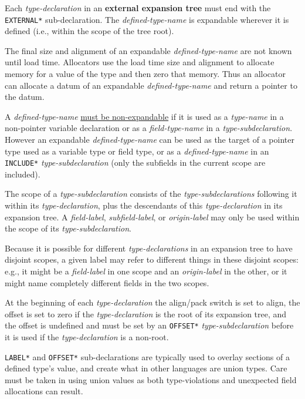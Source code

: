\documentclass[12pt]{article}
\newcommand{\key}[1]{{\rm \bfseries #1}}
\begin{document}
Each {\em type-declaration} in an \key{external expansion tree}
must end with the {\tt *EXTERNAL*}\label{*EXTERNAL*} sub-declaration.
The {\em defined-type-name} is expandable wherever it is defined
(i.e., within the scope of the tree root).

The final size and alignment of an expandable {\em defined-type-name}
are not known until load time.
Allocators use the load time
size and alignment to allocate memory for a value of
the type and then zero that memory.  Thus an allocator
can allocate a datum of an expandable {\em defined-type-name}
and return a pointer to the datum.

A {\em defined-type-name} \underline{must be non-expandable} if it is used as
a {\em type-name} in a non-pointer variable declaration
or as a {\em field-type-name}
in a {\em type-subdeclaration}.
However an expandable
{\em defined-type-name}
can be used as the target of a pointer type used as a variable type or
field type,
or as a {\em defined-type-name} in an
{\tt *INCLUDE*} {\em type-subdeclaration}
(only the subfields in the current scope are included).

The scope of a {\em type-subdeclaration} consists of
the {\em type-subdeclarations} following it within its
{\em type-declaration}, plus the descendants
of this {\em type-declaration} in its expansion tree.
A {\em field-label}, {\em subfield-label}, or {\em origin-label} may
only be used within the scope of its {\em type-subdeclaration}.

Because it is possible for different {\em type-declarations} in
an expansion tree to have disjoint scopes, a given label may refer
to different things in these disjoint scopes: e.g., it might be a
{\em field-label} in one scope and an {\em origin-label} in the
other, or it might name completely different fields in the two scopes.

At the beginning of each {\em type-declaration} the align/pack switch
is set to align, the offset is set to zero if the {\em type-declaration}
is the root of its expansion tree, and the offset is undefined and
must be set by an {\tt *OFFSET*} {\em type-subdeclaration} before
it is used if the {\em type-declaration} is a non-root.

{\tt *LABEL*} and {\tt *OFFSET*} sub-declarations are typically used
to overlay sections of a defined type's value, and create what in other
languages are union types.  Care must be taken in using union values
as both type-violations and unexpected field allocations can result.
\end{document}
